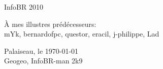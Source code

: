 \thispagestyle{empty}

\begin{center}
\begin{Huge}
InfoBR 2010
\end{Huge}
\end{center}


\begin{flushright}
\begin{large} 
 { \selectfont
\`A mes illustres pr\'ed\'ecesseurs:\\
\smallskip
mYk, bernardofpc, questor, eracil, j-philippe, Lad \\ }
\end{large}
\vspace{1cm}
{Palaiseau, le \today \\
\medskip
 Geogeo, InfoBR-man 2k9  }
\end{flushright} 



\newpage
\thispagestyle{empty}
\vspace*{1cm}
\newpage
